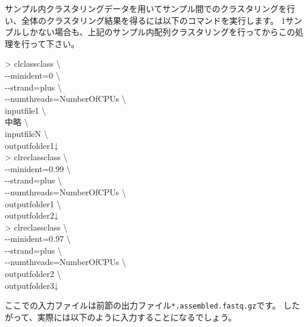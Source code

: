 \documentclass[titlepage,10pt,a4paper,english]{jsbook}
\newenvironment{cmd}{\begin{oframed}\raggedright\ttfamily\footnotesize\setlength{\baselineskip}{1.4em}}{\end{oframed}\vspace{-1em}}
\begin{document}
サンプル内クラスタリングデータを用いてサンプル間でのクラスタリングを行い、全体のクラスタリング結果を得るには以下のコマンドを実行します。
1サンプルしかない場合も、上記のサンプル内配列クラスタリングを行ってからこの処理を行って下さい。
\begin{cmd}
{\textgreater} clclassclass {\textbackslash}\\
{-}{-}minident=0 {\textbackslash}\\
{-}{-}strand=plus {\textbackslash}\\
{-}{-}numthreads=NumberOfCPUs {\textbackslash}\\
inputfile1 {\textbackslash}\\
中略 {\textbackslash}\\
inputfileN {\textbackslash}\\
outputfolder1↓\\
{\textgreater} clreclassclass {\textbackslash}\\
{-}{-}minident=0.99 {\textbackslash}\\
{-}{-}strand=plus {\textbackslash}\\
{-}{-}numthreads=NumberOfCPUs {\textbackslash}\\
outputfolder1 {\textbackslash}\\
outputfolder2↓\\
{\textgreater} clreclassclass {\textbackslash}\\
{-}{-}minident=0.97 {\textbackslash}\\
{-}{-}strand=plus {\textbackslash}\\
{-}{-}numthreads=NumberOfCPUs {\textbackslash}\\
outputfolder2 {\textbackslash}\\
outputfolder3↓
\end{cmd}
ここでの入力ファイルは前節の出力ファイル\texttt{*.assembled.fastq.gz}です。
したがって、実際には以下のように入力することになるでしょう。
\end{document}
